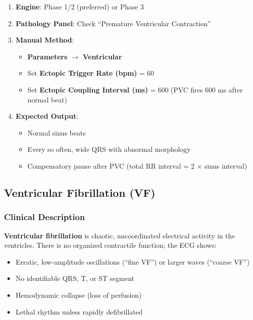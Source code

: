 \documentclass[12pt,a4paper,oneside]{book}
\begin{document}
\begin{enumerate}
    \item \textbf{Engine}: Phase 1/2 (preferred) or Phase 3
    \item \textbf{Pathology Panel}: Check ``Premature Ventricular Contraction''
    \item \textbf{Manual Method}:
    \begin{itemize}
        \item \textbf{Parameters} $\to$ \textbf{Ventricular}
        \item Set \textbf{Ectopic Trigger Rate (bpm)} = 60
        \item Set \textbf{Ectopic Coupling Interval (ms)} = 600 (PVC fires 600 ms after normal beat)
    \end{itemize}
    \item \textbf{Expected Output}:
    \begin{itemize}
        \item Normal sinus beats
        \item Every so often, wide QRS with abnormal morphology
        \item Compensatory pause after PVC (total RR interval = 2 × sinus interval)
    \end{itemize}
\end{enumerate}

\subsection{Ventricular Fibrillation (VF)}

\subsubsection{Clinical Description}

\textbf{Ventricular fibrillation} is chaotic, uncoordinated electrical activity in the ventricles. There is no organized contractile function; the ECG shows:

\begin{itemize}
    \item Erratic, low-amplitude oscillations (``fine VF'') or larger waves (``coarse VF'')
    \item No identifiable QRS, T, or ST segment
    \item Hemodynamic collapse (loss of perfusion)
    \item Lethal rhythm unless rapidly defibrillated
\end{itemize}
\end{document}
